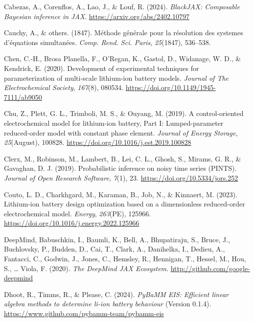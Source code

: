 \documentclass[
]{article}
\newlength{\cslhangindent}
\newenvironment{CSLReferences}[2] %
 {\begin{list}{}{%
  \setlength{\itemindent}{0pt}
  \setlength{\leftmargin}{0pt}
  \setlength{\parsep}{0pt}
  \ifodd #1
   \setlength{\leftmargin}{\cslhangindent}
   \setlength{\itemindent}{-1\cslhangindent}
  \fi
  \setlength{\itemsep}{#2\baselineskip}}}
 {\end{list}}
\begin{document}
\begin{CSLReferences}{1}{0}
Cabezas, A., Corenflos, A., Lao, J., \& Louf, R. (2024). \emph{BlackJAX:
Composable {B}ayesian inference in {JAX}}.
\url{https://arxiv.org/abs/2402.10797}

Cauchy, A., \& others. (1847). M{é}thode g{é}n{é}rale pour la
r{é}solution des systemes d'{é}quations simultan{é}es. \emph{Comp. Rend.
Sci. Paris}, \emph{25}(1847), 536--538.

Chen, C.-H., Brosa Planella, F., O'Regan, K., Gastol, D., Widanage, W.
D., \& Kendrick, E. (2020). Development of experimental techniques for
parameterization of multi-scale lithium-ion battery models.
\emph{Journal of The Electrochemical Society}, \emph{167}(8), 080534.
\url{https://doi.org/10.1149/1945-7111/ab9050}

Chu, Z., Plett, G. L., Trimboli, M. S., \& Ouyang, M. (2019). A
control-oriented electrochemical model for lithium-ion battery, {P}art
{I}: {L}umped-parameter reduced-order model with constant phase element.
\emph{Journal of Energy Storage}, \emph{25}(August), 100828.
\url{https://doi.org/10.1016/j.est.2019.100828}

Clerx, M., Robinson, M., Lambert, B., Lei, C. L., Ghosh, S., Mirams, G.
R., \& Gavaghan, D. J. (2019). Probabilistic inference on noisy time
series ({PINTS}). \emph{Journal of Open Research Software}, \emph{7}(1),
23. \url{https://doi.org/10.5334/jors.252}

Couto, L. D., Charkhgard, M., Karaman, B., Job, N., \& Kinnaert, M.
(2023). Lithium-ion battery design optimization based on a dimensionless
reduced-order electrochemical model. \emph{Energy}, \emph{263}(PE),
125966. \url{https://doi.org/10.1016/j.energy.2022.125966}

DeepMind, Babuschkin, I., Baumli, K., Bell, A., Bhupatiraju, S., Bruce,
J., Buchlovsky, P., Budden, D., Cai, T., Clark, A., Danihelka, I.,
Dedieu, A., Fantacci, C., Godwin, J., Jones, C., Hemsley, R., Hennigan,
T., Hessel, M., Hou, S., \ldots{} Viola, F. (2020). \emph{The
{D}eep{M}ind {JAX} {E}cosystem}. \url{http://github.com/google-deepmind}

Dhoot, R., Timms, R., \& Please, C. (2024). \emph{PyBaMM EIS: Efficient
linear algebra methods to determine li-ion battery behaviour} (Version
0.1.4). \url{https://www.github.com/pybamm-team/pybamm-eis}


\end{CSLReferences}
\end{document}
